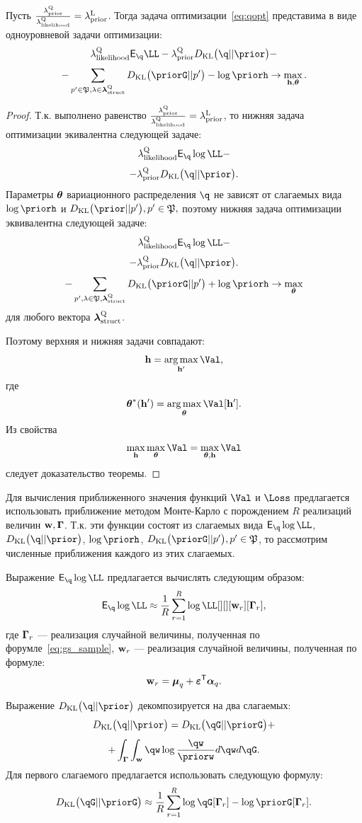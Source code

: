 \begin{theorem}
Пусть $\frac{\lambda_\text{prior}^\text{Q}}{\lambda_\text{likelihood}^\text{Q}} = \lambda_\text{prior}^\text{L}$. 
Тогда задача оптимизации~\eqref{eq:qopt} представима в виде одноуровневой задачи оптимизации:
\[
\lamLL \E_{\q}\LL - \lamCQ \KL{\q}{\prior} -
\]
\[
-\sum_{p' \in \mathfrak{P}, \lambda \in \lamS} \KL{\priorG}{p'} - \log \priorh \to \max_{\h, \teta}. 
\]
\end{theorem}
\begin{proof}
Т.к. выполнено равенство  $\frac{\lambda_\text{prior}^\text{Q}}{\lambda_\text{likelihood}^\text{Q}} = \lambda_\text{prior}^\text{L}$, то нижняя задача оптимизации экивалентна следующей задаче:
\[
\lamLL \E_{\q} \log \LL -  
\]
\[
    -\lamCQ \KL{\q}{\prior}. 
\]
Параметры $\boldsymbol{\theta}$ вариационного распределения $\q$ не зависят от слагаемых вида $\log \priorh$ и $\KL{\prior}{p'}, p' \in \mathfrak{P},$ поэтому нижняя задача оптимизации
эквивалентна следующей задаче:
\[
\lamLL \E_{\q} \log \LL -  
\]
\[
    -\lamCQ \KL{\q}{\prior}. 
\]
\[
-\sum_{p', \lambda \in \mathfrak{P}, \lamS} \KL{\priorG}{p'} + \log \priorh \to \max_{\teta}
\]
для любого вектора $\boldsymbol{\lambda}_\text{struct}^\text{Q}$. 


Поэтому верхняя и нижняя задачи совпадают:
\[
    \h = \argmax_{\h'} \Val,
\]
где 
\[
    \teta^{*}(\h') = \argmax_{\teta} \Val[\h'].
\]
Из свойства 
\[
    \max_{\h}\max_{\teta} \Val = \max_{\teta, \h} \Val
\]
следует доказательство теоремы.
\end{proof}


Для вычисления приближенного значения функций $\Val$ и $\Loss$ предлагается использовать приближение методом Монте-Карло с порождением $R$ реализаций величин $\mathbf{w},\boldsymbol{\Gamma}$.
Т.к. эти функции состоят из слагаемых вида $\E_{\q}\log \LL$, $\KL{\q}{\prior}$, $\log \priorh$, $\KL{\priorG}{p'}, p' \in \mathfrak{P}$, то рассмотрим численные приближения каждого из этих слагаемых.

Выражение $\E_{\q}\log \LL$ предлагается вычислять следующим образом:
\[
    \E_{\q}\log \LL \approx \frac{1}{R}\sum_{r=1}^R \log \LL[][][\w_r][\G_r],
\]
где $\boldsymbol{\Gamma}_r$ --- реализация случайной величины, полученная по форумле~\eqref{eq:gs_sample}, $\mathbf{w}_r$ --- реализация случайной величины, полученная по формуле:
\[
\mathbf{w}_r = \boldsymbol{\mu}_q + \boldsymbol{\varepsilon}^\mathsf{T} \boldsymbol{\alpha}_q.
\]

Выражение $\KL{\q}{\prior}$ декомпозируется на два слагаемых:
\[
    \KL{\q}{\prior} = \KL{\qG}{\priorG} +
\]
\[
+ \int_{\G}\int_{\w}\qw\log\frac{\qw}{\priorw}d\qw d\qG.
\]
Для первого слагаемого предлагается использовать следующую формулу:
\begin{equation}
\label{eq:klg_approx}
    \KL{\qG}{\priorG} \approx \frac{1}{R}\sum_{r=1}^R\log \qG[\G_r] - \log \priorG[\G_r]. 
\end{equation}

